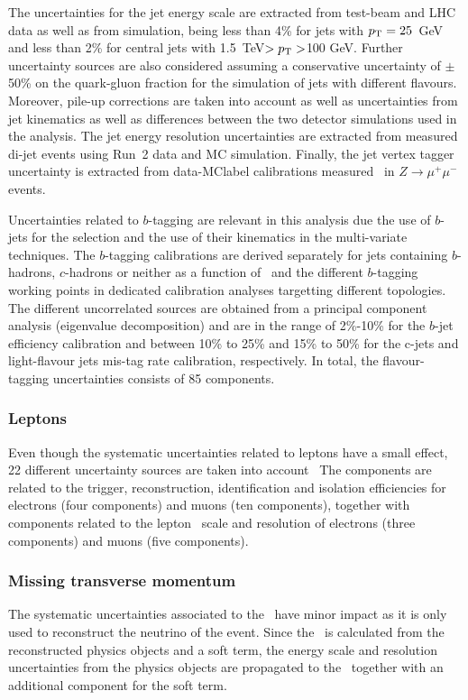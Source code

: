 The uncertainties for the jet energy scale are extracted from test-beam and LHC data as well as from simulation, being less than 4\% for jets with $p_{\text{T}}=25$~GeV and less than 2\% for central jets with 1.5~TeV$>p_{\text{T}}>$100 GeV. Further uncertainty sources are also considered assuming a conservative uncertainty of $\pm$50\% on the quark-gluon fraction for the simulation of jets with different flavours. Moreover, pile-up corrections are taken into account as well as uncertainties from jet kinematics as well as differences between the two detector simulations used in the analysis. The jet energy resolution uncertainties are extracted from measured di-jet events using Run~2 data and MC simulation. Finally, the jet vertex tagger uncertainty is extracted from data-\acrshort{MClabel} calibrations measured~\cite{Bothmann2016} in $Z\to\mu^+\mu^-$ events.

Uncertainties related to $b$-tagging are relevant in this analysis due the use of $b$-jets for the selection and the use of their kinematics in the multi-variate techniques. The $b$-tagging calibrations are derived separately for jets containing $b$-hadrons, $c$-hadrons or neither as a function of \pT\ and the different $b$-tagging working points in dedicated calibration analyses targetting different topologies. The different uncorrelated sources are obtained from a principal component analysis (eigenvalue decomposition) and are in the range of 2\%-10\% for the $b$-jet efficiency calibration and between 10\% to 25\% and
15\% to 50\% for the c-jets and light-flavour jets mis-tag rate calibration, respectively. In total, the flavour-tagging uncertainties consists of 85 components.

\subsubsection{Leptons}
Even though the systematic uncertainties related to leptons have a small effect, 22 different uncertainty sources are taken into account~\cite{Aad_2019,Aad_2016}
The components are related to the trigger, reconstruction, identification and isolation efficiencies for electrons (four components) and muons (ten components), together with components related to the lepton \pT\ scale and resolution of electrons (three components) and muons (five components).

\subsubsection{Missing transverse momentum}
The systematic uncertainties associated to the \MET\ have minor impact as it is only used to reconstruct the neutrino of the event. Since the \MET\ is calculated from the reconstructed physics objects and a soft term, the energy scale and resolution uncertainties from the physics objects are propagated to the \MET\ together with an additional component for the soft term. 

